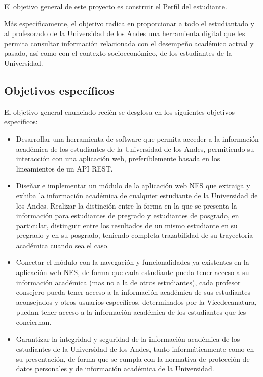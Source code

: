 El objetivo general de este proyecto es construir el Perfil del estudiante.

Más específicamente, el objetivo radica en proporcionar a todo el estudiantado y al profesorado de la Universidad de los Andes una herramienta digital que les permita consultar información relacionada con el desempeño académico actual y pasado, así como con el contexto socioeconómico, de los estudiantes de la Universidad.

\subsection{Objetivos específicos}

El objetivo general enunciado recién se desglosa en los siguientes objetivos específicos:
\begin{itemize}
	\item Desarrollar una herramienta de software que permita acceder a la información académica de los estudiantes de la Universidad de los Andes, permitiendo su interacción con una aplicación web, preferiblemente basada en los lineamientos de un \gls{API REST}.
	\item Diseñar e implementar un módulo de la aplicación web \gls{NES} que extraiga y exhiba la información académica de cualquier estudiante de la Universidad de los Andes. Realizar la distinción entre la forma en la que se presenta la información para estudiantes de pregrado y estudiantes de posgrado, en particular, distinguir entre los resultados de un mismo estudiante en su pregrado y en su posgrado, teniendo completa trazabilidad de su trayectoria académica cuando sea el caso.
	\item Conectar el módulo con la navegación y funcionalidades ya existentes en la aplicación web \gls{NES}, de forma que cada estudiante pueda tener acceso a su información académica (mas no a la de otros estudiantes), cada profesor consejero pueda tener acceso a la información académica de sus estudiantes aconsejados y otros usuarios específicos, determinados por la Vicedecanatura, puedan tener acceso a la información académica de los estudiantes que les conciernan.
	\item Garantizar la integridad y seguridad de la información académica de los estudiantes de la Universidad de los Andes, tanto informáticamente como en su presentación, de forma que se cumpla con la normativa de protección de datos personales y de información académica de la Universidad.
\end{itemize}

